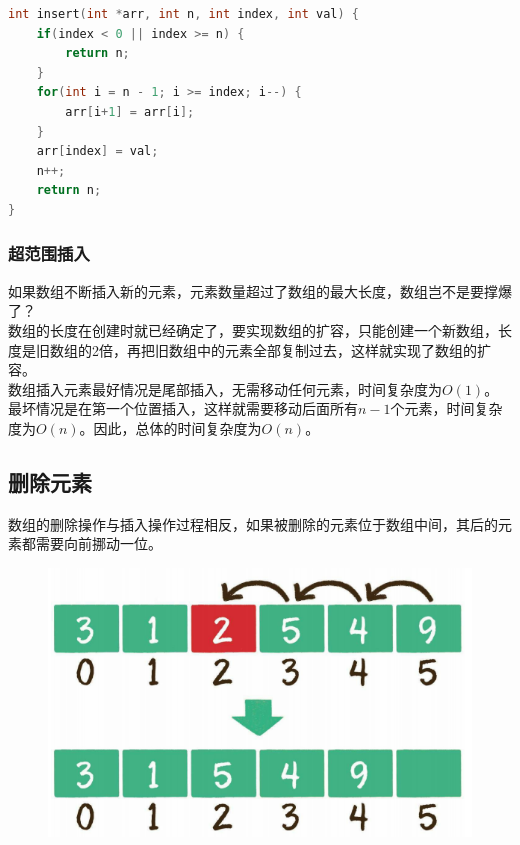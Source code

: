 
\begin{lstlisting}[language=C]
int insert(int *arr, int n, int index, int val) {
    if(index < 0 || index >= n) {
        return n;
    }
    for(int i = n - 1; i >= index; i--) {
        arr[i+1] = arr[i];
    }
    arr[index] = val;
    n++;
    return n;
}
\end{lstlisting}

\subsubsection{超范围插入}

如果数组不断插入新的元素，元素数量超过了数组的最大长度，数组岂不是要撑爆了？ \\

数组的长度在创建时就已经确定了，要实现数组的扩容，只能创建一个新数组，长度是旧数组的2倍，再把旧数组中的元素全部复制过去，这样就实现了数组的扩容。 \\

数组插入元素最好情况是尾部插入，无需移动任何元素，时间复杂度为$ O(1) $。最坏情况是在第一个位置插入，这样就需要移动后面所有$ n - 1 $个元素，时间复杂度为$ O(n) $。因此，总体的时间复杂度为$ O(n) $。

\subsection{删除元素}

数组的删除操作与插入操作过程相反，如果被删除的元素位于数组中间，其后的元素都需要向前挪动一位。

\begin{figure}[H]
	\centering
	\includegraphics[scale=0.8]{img/C2/2-3/3.png}
\end{figure}


